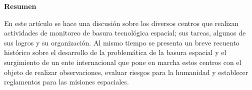 \begin{small}
\begin{center}
\vspace{9pt}
\textbf{Resumen}    
\end{center}

\begin{adjustwidth}{20pt}{20pt}
\small \noindent En este artículo se hace una discusión sobre los diversos centros que realizan actividades de monitoreo de basura tecnológica espacial; sus tareas, algunos de sus logros y su organización. Al mismo tiempo se presenta un breve recuento histórico sobre el desarrollo de la problemática de la basura espacial y el surgimiento de un ente internacional que pone en marcha estos centros con el objeto de realizar observaciones, evaluar riesgos para la humanidad y establecer reglamentos para las misiones espaciales.
\end{adjustwidth}


\end{small}

